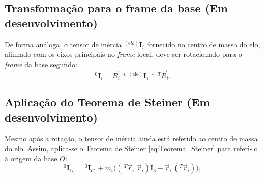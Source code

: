 \subsection{Transformação para o frame da base (Em desenvolvimento)}
De forma análoga, o tensor de inércia ${}^{(elo)}\mathbf{I}_{i}$ fornecido no centro de massa do elo, alinhado com os eixos principais no \emph{frame} local, deve ser rotacionado para o \emph{frame} da base segundo:
\begin{equation}
    {}^{0}\mathbf{I}_{i} =
    \vec{R}_i \,*\,
    {}^{(\text{elo})}\mathbf{I}_{i}
    \,*\, {}^{\, T} \vec{R}_i.
\end{equation}




\subsection{Aplicação do Teorema de Steiner (Em desenvolvimento)}
Mesmo após a rotação, o tensor de inércia ainda está referido ao centro de massa do elo. Assim, aplica-se o Teorema de Steiner \eqref{eq:Teorema_Steiner} para referi-lo à origem da base $O$:
\begin{equation}
  \label{eq:Teorema_Steiner}
  {}^{0} \mathbf{I}_{O_i} =
  {}^{0} \mathbf{I}_{C_i} +
  m_i
    \big(
    ({}^{\,\, T} \vec r_i \,\, \vec r_i)
    \mathbf{I}_3 - \vec r_i \, ({}^{T} \vec r_i)
    \big),
\end{equation}

